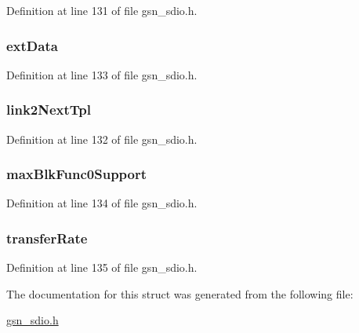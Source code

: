 Definition at line 131 of file gsn\_\-sdio.h.

\hypertarget{a00219_ade674e1ace532b93e6d9907c14f02728}{
\subsubsection[{extData}]{ {\bf extData}}}
\label{a00219_ade674e1ace532b93e6d9907c14f02728}


Definition at line 133 of file gsn\_\-sdio.h.

\hypertarget{a00219_adb5f177f5de86565991790a9c2c079b5}{
\subsubsection[{link2NextTpl}]{ {\bf link2NextTpl}}}
\label{a00219_adb5f177f5de86565991790a9c2c079b5}


Definition at line 132 of file gsn\_\-sdio.h.

\hypertarget{a00219_af215d56dbf44b25531029ab41ee5961c}{
\subsubsection[{maxBlkFunc0Support}]{ {\bf maxBlkFunc0Support}}}
\label{a00219_af215d56dbf44b25531029ab41ee5961c}


Definition at line 134 of file gsn\_\-sdio.h.

\hypertarget{a00219_a2314dc87991ad0a1f1b6f8adfc52c476}{
\subsubsection[{transferRate}]{ {\bf transferRate}}}
\label{a00219_a2314dc87991ad0a1f1b6f8adfc52c476}


Definition at line 135 of file gsn\_\-sdio.h.



The documentation for this struct was generated from the following file:\begin{DoxyCompactItemize}
\item 
\hyperlink{a00584}{gsn\_\-sdio.h}\end{DoxyCompactItemize}
